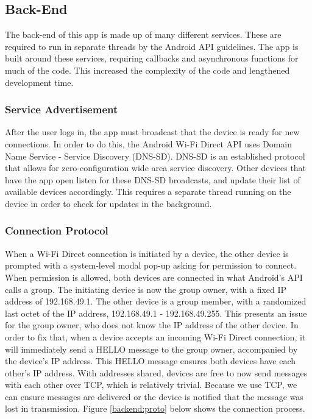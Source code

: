 \documentclass[10pt]{article}
\begin{document}
\subsection{Back-End}
The back-end of this app is made up of many different services. These are required to run in separate threads by the Android API guidelines. The app is built around these services, requiring callbacks and asynchronous functions for much of the code. This increased the complexity of the code and lengthened development time.
\subsubsection{Service Advertisement}
After the user logs in, the app must broadcast that the device is ready for new connections. In order to do this, the Android Wi-Fi Direct API uses Domain Name Service - Service Discovery (DNS-SD). DNS-SD is an established protocol that allows for zero-configuration wide area service discovery. Other devices that have the app open listen for these DNS-SD broadcasts, and update their list of available devices accordingly. This requires a separate thread running on the device in order to check for updates in the background.
\subsubsection{Connection Protocol}
When a Wi-Fi Direct connection is initiated by a device, the other device is prompted with a system-level modal pop-up asking for permission to connect. When permission is allowed, both devices are connected in what Android's API calls a group. The initiating device is now the group owner, with a fixed IP address of 192.168.49.1. The other device is a group member, with a randomized last octet of the IP address, 192.168.49.1 - 192.168.49.255. This presents an issue for the group owner, who does not know the IP address of the other device. In order to fix that, when a device accepts an incoming Wi-Fi Direct connection, it will immediately send a HELLO message to the group owner, accompanied by the device's IP address. This HELLO message ensures both devices have each other's IP address. With addresses shared, devices are free to now send messages with each other over TCP, which is relatively trivial. Because we use TCP, we can ensure messages are delivered or the device is notified that the message was lost in transmission. Figure \ref{backend:proto} below shows the connection process.
\end{document}
